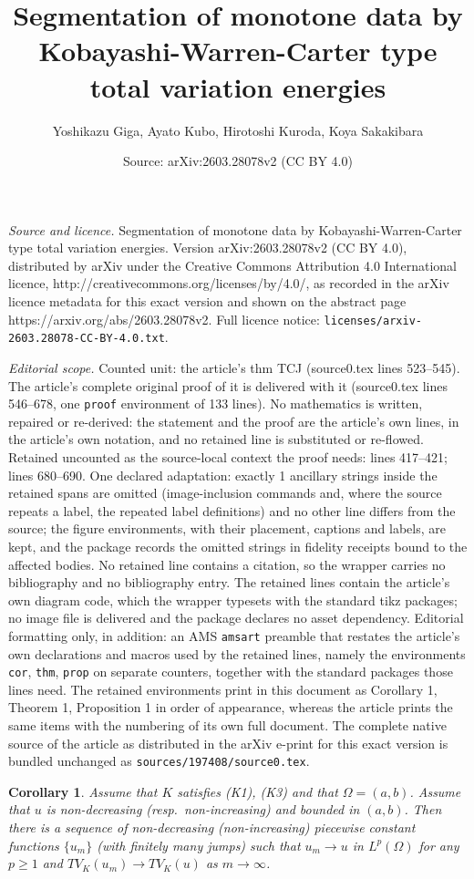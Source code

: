 \documentclass[10pt,a4paper]{amsart}
\title{Segmentation of monotone data by Kobayashi-Warren-Carter type total variation energies}
\author{Yoshikazu Giga, Ayato Kubo, Hirotoshi Kuroda, Koya Sakakibara}
\date{Source: arXiv:2603.28078v2 (CC BY 4.0)}
\newtheorem{cor}{Corollary}
\begin{document}
\maketitle

\noindent\emph{Source and licence.} Segmentation of monotone data by Kobayashi-Warren-Carter type total variation energies. Version arXiv:2603.28078v2 (CC BY 4.0), distributed by arXiv under the Creative Commons Attribution 4.0 International licence, http://creativecommons.org/licenses/by/4.0/, as recorded in the arXiv licence metadata for this exact version and shown on the abstract page https://arxiv.org/abs/2603.28078v2. Full licence notice: \texttt{licenses/arxiv-2603.28078-CC-BY-4.0.txt}.\par\smallskip

\noindent\textit{Editorial scope.} Counted unit: the article's thm TCJ (source0.tex lines 523--545). The article's complete original proof of it is delivered with it (source0.tex lines 546--678, one \texttt{proof} environment of 133 lines). No mathematics is written, repaired or re-derived: the statement and the proof are the article's own lines, in the article's own notation, and no retained line is substituted or re-flowed.  Retained uncounted as the source-local context the proof needs: lines 417--421; lines 680--690.  One declared adaptation: exactly 1 ancillary strings inside the retained spans are omitted (image-inclusion commands and, where the source repeats a label, the repeated label definitions) and no other line differs from the source; the figure environments, with their placement, captions and labels, are kept, and the package records the omitted strings in fidelity receipts bound to the affected bodies.  No retained line contains a citation, so the wrapper carries no bibliography and no bibliography entry.  The retained lines contain the article's own diagram code, which the wrapper typesets with the standard tikz packages; no image file is delivered and the package declares no asset dependency.  Editorial formatting only, in addition: an AMS \texttt{amsart} preamble that restates the article's own declarations and macros used by the retained lines, namely the environments \texttt{cor}, \texttt{thm}, \texttt{prop} on separate counters, together with the standard packages those lines need.  The retained environments print in this document as Corollary 1, Theorem 1, Proposition 1 in order of appearance, whereas the article prints the same items with the numbering of its own full document.  The complete native source of the article as distributed in the arXiv e-print for this exact version is bundled unchanged as \texttt{sources/197408/source0.tex}.
\begin{cor} \label{CApMon}
Assume that $K$ satisfies (K1), (K3) and that $\Omega=(a,b)$.
 Assume that $u$ is non-decreasing (resp.\ non-increasing) and bounded in $(a,b)$.
 Then there is a sequence of non-decreasing (non-increasing) piecewise constant functions $\{u_m\}$ (with finitely many jumps) such that $u_m\to u$ in $L^p(\Omega)$ for any $p\ge1$ and $TV_K(u_m)\to TV_K(u)$ as $m\to\infty$.
\end{cor}
\end{document}
